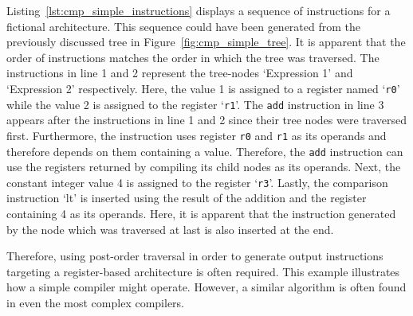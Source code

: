 
Listing~\ref{lst:cmp_simple_instructions} displays a sequence of instructions for a fictional architecture.
This sequence could have been generated from the previously discussed tree in Figure~\ref{fig:cmp_simple_tree}.
It is apparent that the order of instructions matches the order in which the tree was traversed.
The instructions in line 1 and 2 represent the tree-nodes `Expression 1' and `Expression 2' respectively.
Here, the value 1 is assigned to a register named `\texttt{r0}' while the value 2 is assigned to the register `\texttt{r1}'.
The \texttt{add} instruction in line 3 appears after the instructions in line 1 and 2 since their tree nodes were traversed first.
Furthermore, the instruction uses register \texttt{r0} and \texttt{r1} as its operands and therefore depends on them containing a value.
Therefore, the \texttt{add} instruction can use the registers returned by compiling its child nodes as its operands.
Next, the constant integer value 4 is assigned to the register `\texttt{r3}'.
Lastly, the comparison instruction `lt' is inserted using the result of the addition and the register containing 4 as its operands.
Here, it is apparent that the instruction generated by the node which was traversed at last is also inserted at the end.

Therefore, using post-order traversal in order to generate output instructions targeting a register-based architecture is often required.
This example illustrates how a simple compiler might operate.
However, a similar algorithm is often found in even the most complex compilers.
